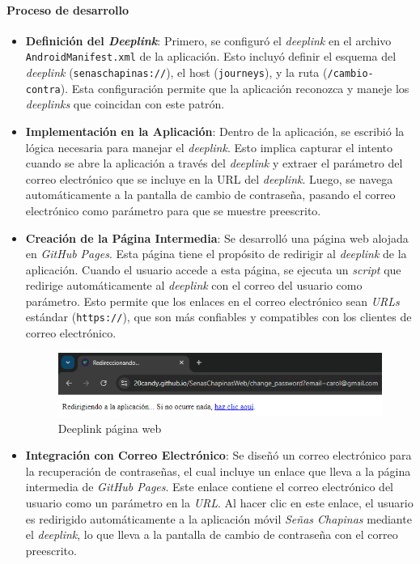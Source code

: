 \paragraph*{Proceso de desarrollo}
\begin{itemize}
    \item \textbf{Definición del \textit{Deeplink}}: Primero, se configuró el \textit{deeplink} en el archivo \texttt{AndroidManifest.xml} de la aplicación. Esto incluyó definir el esquema del \textit{deeplink} (\texttt{senaschapinas://}), el host (\texttt{journeys}), y la ruta (\texttt{/cambio-contra}). Esta configuración permite que la aplicación reconozca y maneje los \textit{deeplinks} que coincidan con este patrón.
    
    \item \textbf{Implementación en la Aplicación}: Dentro de la aplicación, se escribió la lógica necesaria para manejar el \textit{deeplink}. Esto implica capturar el intento cuando se abre la aplicación a través del \textit{deeplink} y extraer el parámetro del correo electrónico que se incluye en la URL del \textit{deeplink}. Luego, se navega automáticamente a la pantalla de cambio de contraseña, pasando el correo electrónico como parámetro para que se muestre preescrito.
    
    \item \textbf{Creación de la Página Intermedia}: Se desarrolló una página web alojada en\textit{ GitHub Pages}. Esta página tiene el propósito de redirigir al \textit{deeplink} de la aplicación. Cuando el usuario accede a esta página, se ejecuta un \textit{script} que redirige automáticamente al \textit{ deeplink} con el correo del usuario como parámetro. Esto permite que los enlaces en el correo electrónico sean \textit{URLs} estándar (\texttt{https://}), que son más confiables y compatibles con los clientes de correo electrónico.

        \begin{figure} [H]
            \centering
            \includegraphics[width=0.5\linewidth]{figuras/pagina_web_deeplink.png}
            \caption{Deeplink página web}
            \label{fig:enter-label}
        \end{figure}
        
    
    \item \textbf{Integración con Correo Electrónico}: Se diseñó un correo electrónico para la recuperación de contraseñas, el cual incluye un enlace que lleva a la página intermedia de \textit{GitHub Pages}. Este enlace contiene el correo electrónico del usuario como un parámetro en la \textit{URL}. Al hacer clic en este enlace, el usuario es redirigido automáticamente a la aplicación móvil \textit{Señas Chapinas} mediante el \textit{deeplink}, lo que lleva a la pantalla de cambio de contraseña con el correo preescrito.
           

\end{itemize}
